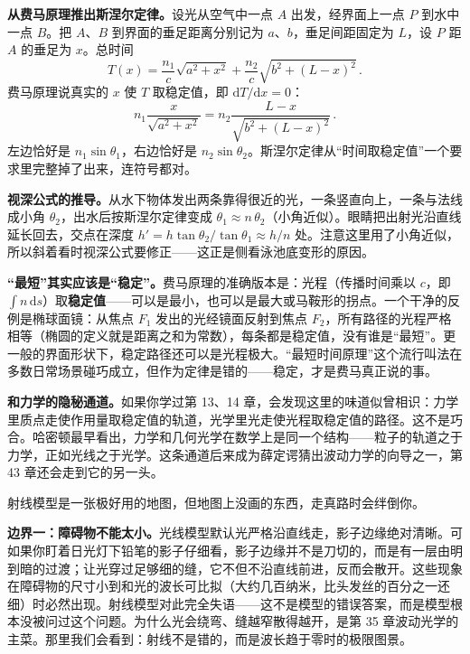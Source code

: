\begin{mathbridge}
\textbf{从费马原理推出斯涅尔定律。}设光从空气中一点 \(A\) 出发，经界面上一点 \(P\) 到水中一点 \(B\)。把 \(A\)、\(B\) 到界面的垂足距离分别记为 \(a\)、\(b\)，垂足间距固定为 \(L\)，设 \(P\) 距 \(A\) 的垂足为 \(x\)。总时间
\[
T(x)=\frac{n_1}{c}\sqrt{a^2+x^2}+\frac{n_2}{c}\sqrt{b^2+(L-x)^2}\,.
\]
费马原理说真实的 \(x\) 使 \(T\) 取稳定值，即 \(\mathrm{d}T/\mathrm{d}x=0\)：
\[
n_1\frac{x}{\sqrt{a^2+x^2}}=n_2\frac{L-x}{\sqrt{b^2+(L-x)^2}}\,.
\]
左边恰好是 \(n_1\sin\theta_1\)，右边恰好是 \(n_2\sin\theta_2\)。斯涅尔定律从“时间取稳定值”一个要求里完整掉了出来，连符号都对。

\textbf{视深公式的推导。}从水下物体发出两条靠得很近的光，一条竖直向上，一条与法线成小角 \(\theta_2\)，出水后按斯涅尔定律变成 \(\theta_1\approx n\,\theta_2\)（小角近似）。眼睛把出射光沿直线延长回去，交点在深度 \(h'=h\tan\theta_2/\tan\theta_1\approx h/n\) 处。注意这里用了小角近似，所以斜着看时视深公式要修正——这正是侧看泳池底变形的原因。
\end{mathbridge}

\begin{challenge}
\textbf{“最短”其实应该是“稳定”。}费马原理的准确版本是：光程（传播时间乘以 \(c\)，即 \(\int n\,\mathrm{d}s\)）取\textbf{稳定值}——可以是最小，也可以是最大或马鞍形的拐点。一个干净的反例是椭球面镜：从焦点 \(F_1\) 发出的光经镜面反射到焦点 \(F_2\)，所有路径的光程严格相等（椭圆的定义就是距离之和为常数），每条都是稳定值，没有谁是“最短”。更一般的界面形状下，稳定路径还可以是光程极大。“最短时间原理”这个流行叫法在多数日常场景碰巧成立，但作为定律是错的——稳定，才是费马真正说的事。

\textbf{和力学的隐秘通道。}如果你学过第 13、14 章，会发现这里的味道似曾相识：力学里质点走使作用量取稳定值的轨道，光学里光走使光程取稳定值的路径。这不是巧合。哈密顿最早看出，力学和几何光学在数学上是同一个结构——粒子的轨道之于力学，正如光线之于光学。这条通道后来成为薛定谔猜出波动力学的向导之一，第 43 章还会走到它的另一头。
\end{challenge}


射线模型是一张极好用的地图，但地图上没画的东西，走真路时会绊倒你。

\textbf{边界一：障碍物不能太小。}光线模型默认光严格沿直线走，影子边缘绝对清晰。可如果你盯着日光灯下铅笔的影子仔细看，影子边缘并不是刀切的，而是有一层由明到暗的过渡；让光穿过足够细的缝，它不但不沿直线前进，反而会散开。这些现象在障碍物的尺寸小到和光的波长可比拟（大约几百纳米，比头发丝的百分之一还细）时必然出现。射线模型对此完全失语——这不是模型的错误答案，而是模型根本没被问过这个问题。为什么光会绕弯、缝越窄散得越开，是第 35 章波动光学的主菜。那里我们会看到：射线不是错的，而是波长趋于零时的极限图景。

